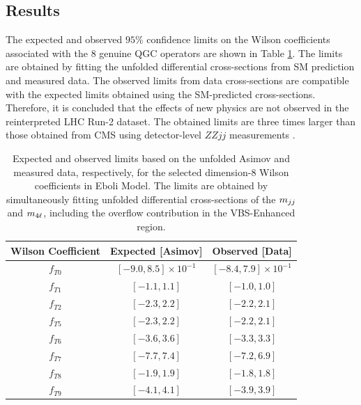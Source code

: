 \subsection{Results}
\label{subsec:EFT_Results}
The expected and observed $95\%$ confidence limits on the Wilson coefficients associated with the $8$ genuine QGC operators are shown in Table \ref{tab:twoobsofeboli}. The limits are obtained by fitting the unfolded differential cross-sections from SM prediction and measured data. The observed limits from data cross-sections are compatible with the expected limits obtained using the SM-predicted cross-sections. Therefore, it is concluded that the effects of new physics are not observed in the reinterpreted LHC Run-2 dataset. The obtained limits are three times larger than those obtained from CMS using detector-level $ZZjj$ measurements \cite{CMSRun2ZZjj}.

\begin{table}[!htbp]
    \centering
    \caption{Expected and observed limits based on the unfolded Asimov and measured data, respectively, for the selected dimension-8 Wilson coefficients in Eboli Model. The limits are obtained by simultaneously fitting unfolded differential cross-sections of the $m_{jj}$ and $m_{4\ell}$, including the overflow contribution in the VBS-Enhanced region. \label{tab:twoobsofeboli}}
    \begin{tabular}{| c | c | c |}
        \hline
        Wilson Coefficient &    Expected [Asimov]  & Observed [Data]         \\
        \hline\hline
        $f_{T0}$ &  $[-9.0, 8.5]\times 10^{-1}$  & $[-8.4, 7.9] \times 10^{-1}$ \\
        $f_{T1}$ &  $[-1.1, 1.1]$ & $[-1.0, 1.0]$ \\
        $f_{T2}$ &  $[-2.3, 2.2]$ & $[-2.2, 2.1]$ \\
        $f_{T5}$ &  $[-2.3, 2.2]$ & $[-2.2, 2.1]$ \\
        $f_{T6}$ &  $[-3.6, 3.6]$ & $[-3.3, 3.3]$ \\
        $f_{T7}$ &  $[-7.7, 7.4]$ & $[-7.2, 6.9]$ \\
        $f_{T8}$ &  $[-1.9, 1.9]$ & $[-1.8, 1.8]$ \\
        $f_{T9}$ &  $[-4.1, 4.1]$ & $[-3.9, 3.9] $\\                               
        \hline
    \end{tabular}
\end{table}